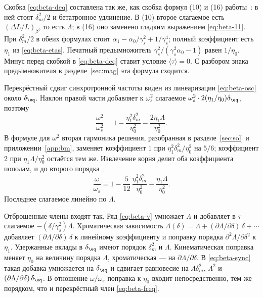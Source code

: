 Скобка \eqref{eq:beta-deq} составлена так же, как скобка формул (10) и (16) работы~\cite{Senichev2013}: в ней стоят $\delta_m^2/2$ и бетатронное удлинение. В (10) второе слагаемое есть $(\Delta L/L)_\beta$, то есть $\Lambda$; в (16) оно заменено гладким выражением \eqref{eq:beta-11}. При $\delta_m^2/2$ в обеих формулах стоит $\alpha_1-\alpha_0/\gamma_s^2+1/\gamma_s^4$; полный коэффициент есть $\eta_1$ из \eqref{eq:beta-etas}. Печатный предымножитель $\gamma_s^2/(\gamma_s^2\alpha_0-1)$ равен $1/\eta_0$. Минус перед скобкой в \eqref{eq:beta-deq} ставит условие $\langle\tau\rangle=0$. С разбором знака предымножителя в разделе~\ref{sec:mag} эта формула сходится.

Перекрёстный сдвиг синхротронной частоты виден из линеаризации \eqref{eq:beta-osc} около $\delta_\eq$. Наклон правой части добавляет к $\omega_s^2$ слагаемое $\omega_s^2\cdot 2(\eta_1/\eta_0)\delta_\eq$, поэтому
\begin{equation}
\label{eq:beta-slope}
\frac{\omega^2}{\omega_s^2}
=1-\frac{\eta_1^2\delta_m^2}{\eta_0^2}-\frac{2\eta_1\Lambda}{\eta_0^2}.
\end{equation}
В формуле для $\omega^2$ вторая гармоника решения, разобранная в разделе~\ref{sec:sol} и приложении~\ref{app:bm}, заменяет коэффициент $1$ при $\eta_1^2\delta_m^2/\eta_0^2$ на $5/6$; коэффициент $2$ при $\eta_1\Lambda/\eta_0^2$ остаётся тем же. Извлечение корня делит оба коэффициента пополам, и до второго порядка
\begin{equation}
\label{eq:beta-freq}
\frac{\omega}{\omega_s}
=1-\frac{5}{12}\,\frac{\eta_1^2\delta_m^2}{\eta_0^2}
-\frac{\eta_1\Lambda}{\eta_0^2}.
\end{equation}
Последнее слагаемое линейно по $\Lambda$.

Отброшенные члены входят так. Ряд \eqref{eq:beta-v} умножает $\Lambda$ и добавляет в $\tau$ слагаемое $-(\delta/\gamma_s^2)\Lambda$. Хроматическая зависимость $\Lambda(\delta)=\Lambda+(\partial\Lambda/\partial\delta)\,\delta+\cdots$ добавляет $(\partial\Lambda/\partial\delta)\,\delta$ к линейному коэффициенту и поправку порядка $\partial^2\Lambda/\partial\delta^2$ к $\eta_1$. Удержанные вклады в $\delta_\eq$ имеют порядок $\delta_m^2$ и $\Lambda$. Кинематическая поправка меняет $\eta_0$ на величину порядка $\Lambda$, хроматическая --- на $\partial\Lambda/\partial\delta$. В \eqref{eq:beta-sync} такая добавка умножается на $\delta_\eq$ и сдвигает равновесие на $\Lambda\delta_m^2$, $\Lambda^2$ и $(\partial\Lambda/\partial\delta)\,\delta_\eq$. В отношение $\omega/\omega_s$ поправка к $\eta_0$ входит непосредственно, тем же порядком, что и перекрёстный член \eqref{eq:beta-freq}.
